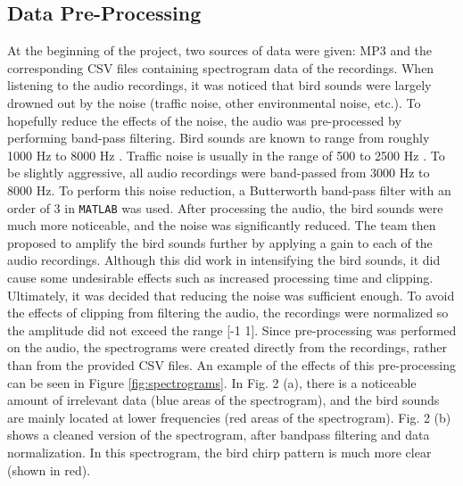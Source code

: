 \documentclass[12pt, conference]{IEEEtran}
\begin{document}
\subsection{Data Pre-Processing}
At the beginning of the project, two sources of data were given: MP3 and the corresponding CSV files containing spectrogram data of the recordings. When listening to the audio recordings, it was noticed that bird sounds were largely drowned out by the noise (traffic noise, other environmental noise, etc.). To hopefully reduce the effects of the noise, the audio was pre-processed by performing band-pass filtering. Bird sounds are known to range from roughly 1000 Hz to 8000 Hz \cite{allaboutbirds}. Traffic noise is usually in the range of 500 to 2500 Hz \cite{trafficnoise}. To be slightly aggressive, all audio recordings were band-passed from 3000 Hz to 8000 Hz. To perform this noise reduction, a Butterworth band-pass filter with an order of 3 in \texttt{MATLAB} was used. After processing the audio, the bird sounds were much more noticeable, and the noise was significantly reduced. The team then proposed to amplify the bird sounds further by applying a gain to each of the audio recordings. Although this did work in intensifying the bird sounds, it did cause some undesirable effects such as increased processing time and clipping. Ultimately, it was decided that reducing the noise was sufficient enough. To avoid the effects of clipping from filtering the audio, the recordings were normalized so the amplitude did not exceed the range [-1 1]. Since pre-processing was performed on the audio, the spectrograms were created directly from the recordings, rather than from the provided CSV files. An example of the effects of this pre-processing can be seen in Figure \ref{fig:spectrograms}. In Fig. 2 (a), there is a noticeable amount of irrelevant data (blue areas of the spectrogram), and the bird sounds are mainly located at lower frequencies (red areas of the spectrogram). Fig. 2 (b) shows a cleaned version of the spectrogram, after bandpass filtering and data normalization. In this spectrogram, the bird chirp pattern is much more clear (shown in red).
\end{document}
